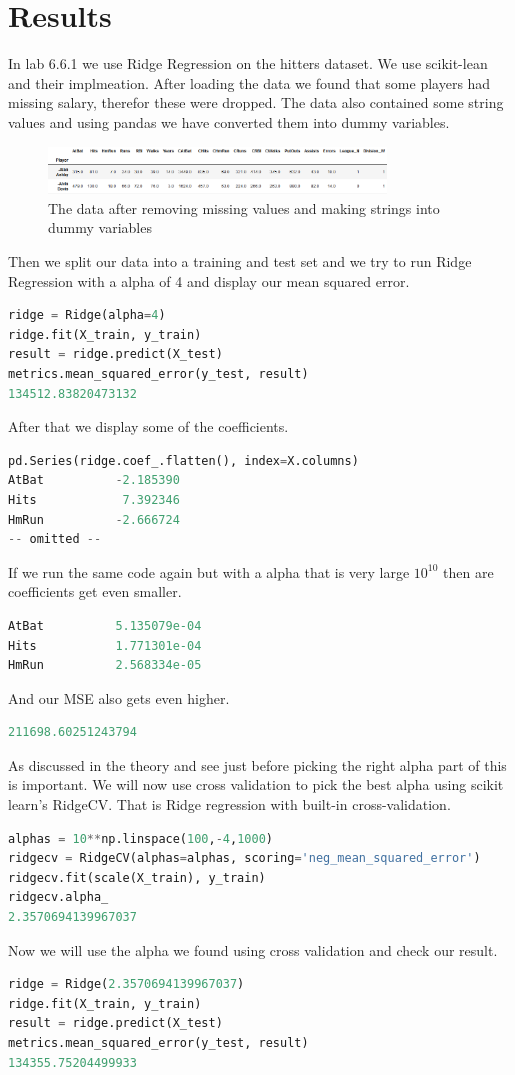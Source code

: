 \section{Results}
In lab 6.6.1 we use Ridge Regression on the hitters dataset. We use scikit-lean and their implmeation. After loading the data we found that some players had missing salary, therefor these were dropped. The data also contained some string values and using pandas we have converted them into dummy variables.  
\begin{figure}[H]
	\centering
	\includegraphics[width=0.8\textwidth]{shrinkageMethods/fig/data.png}
	\caption{The data after removing missing values and making strings into dummy variables }
	\label{fig:normfirstsecond}
\end{figure}
Then we split our data into a training and test set and we try to run Ridge Regression with a alpha of 4 and display our mean squared error.
\begin{lstlisting}[language=Python]
ridge = Ridge(alpha=4)
ridge.fit(X_train, y_train)
result = ridge.predict(X_test)
metrics.mean_squared_error(y_test, result)
134512.83820473132
\end{lstlisting}
After that we display some of the coefficients.
\begin{lstlisting}[language=Python]
pd.Series(ridge.coef_.flatten(), index=X.columns)
AtBat          -2.185390
Hits            7.392346
HmRun          -2.666724
-- omitted --
\end{lstlisting}
If we run the same code again but with a alpha that is very large $10^10$ then are coefficients get even smaller.
\begin{lstlisting}[language=Python]
AtBat          5.135079e-04
Hits           1.771301e-04
HmRun          2.568334e-05
\end{lstlisting}
And our MSE also gets even higher.
\begin{lstlisting}[language=Python]
211698.60251243794
\end{lstlisting}
As discussed in the theory and see just before picking the right alpha part of this is important. We will now use cross validation to pick the best alpha using scikit learn's RidgeCV. That is Ridge regression with built-in cross-validation.
\begin{lstlisting}[language=Python]
alphas = 10**np.linspace(100,-4,1000)
ridgecv = RidgeCV(alphas=alphas, scoring='neg_mean_squared_error')
ridgecv.fit(scale(X_train), y_train)
ridgecv.alpha_
2.3570694139967037
\end{lstlisting}
Now we will use the alpha we found using  cross validation and check our result.
\begin{lstlisting}[language=Python]
ridge = Ridge(2.3570694139967037)
ridge.fit(X_train, y_train)
result = ridge.predict(X_test)
metrics.mean_squared_error(y_test, result)
134355.75204499933
\end{lstlisting}

